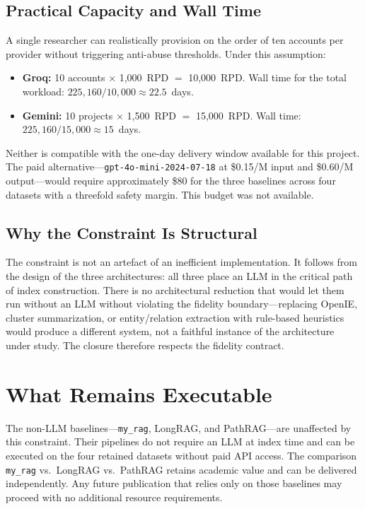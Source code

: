 \documentclass[11pt,a4paper]{article}
\begin{document}
\subsection{Practical Capacity and Wall Time}

A single researcher can realistically provision on the order of ten accounts per provider without triggering anti-abuse thresholds. Under this assumption:

\begin{itemize}[leftmargin=*,nosep]
  \item \textbf{Groq:} 10 accounts $\times$ 1{,}000~RPD $=$ 10{,}000~RPD. Wall time for the total workload: $225{,}160 / 10{,}000 \approx 22.5$~days.
  \item \textbf{Gemini:} 10 projects $\times$ 1{,}500~RPD $=$ 15{,}000~RPD. Wall time: $225{,}160 / 15{,}000 \approx 15$~days.
\end{itemize}

Neither is compatible with the one-day delivery window available for this project. The paid alternative---\texttt{gpt-4o-mini-2024-07-18} at \$0.15/M input and \$0.60/M output---would require approximately \$80 for the three baselines across four datasets with a threefold safety margin. This budget was not available.

\subsection{Why the Constraint Is Structural}

The constraint is not an artefact of an inefficient implementation. It follows from the design of the three architectures: all three place an LLM in the critical path of index construction. There is no architectural reduction that would let them run without an LLM without violating the fidelity boundary---replacing OpenIE, cluster summarization, or entity/relation extraction with rule-based heuristics would produce a different system, not a faithful instance of the architecture under study. The closure therefore respects the fidelity contract.

\section{What Remains Executable}
\label{sec:exec}

The non-LLM baselines---\texttt{my\_rag}, LongRAG, and PathRAG---are unaffected by this constraint. Their pipelines do not require an LLM at index time and can be executed on the four retained datasets without paid API access. The comparison \texttt{my\_rag} vs.\ LongRAG vs.\ PathRAG retains academic value and can be delivered independently. Any future publication that relies only on those baselines may proceed with no additional resource requirements.
\end{document}

